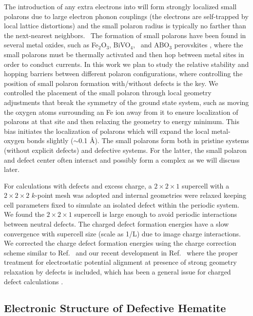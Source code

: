 The introduction of any extra electrons into  will form strongly localized small polarons due to large electron phonon couplings (the electrons are self-trapped by local lattice distortions) and the small polaron radius is typically no farther than the next-nearest neighbors.~\cite{austin1969polarons} The formation of small polarons have been found in several metal oxides, such as Fe$_2$O$_3$, BiVO$_4$,~\cite{kim2015simultaneous} and ABO$_{3}$ perovskites \cite{eglitis2014ab}, where the small polarons must be thermally activated and then hop between metal sites in order to conduct currents. In this work we plan to study the relative stability and hopping barriers between different polaron configurations, where controlling the position of small polaron formation with/without defects is the key. We controlled the placement of the small polaron through local geometry adjustments that break the symmetry of the ground state system, such as moving the oxygen atoms surrounding an Fe ion away from it to ensure localization of polarons at that site and then relaxing the geometry to energy minimum. This bias initiates the localization of polarons which will expand the local metal-oxygen bonds slightly ($\sim$0.1 \AA).  The small polarons form both in pristine systems (without explicit defects) and defective systems. For the latter, the small polaron and defect center often interact and possibly form a complex as we will discuss later.

For calculations with defects and excess charge, a $2\times 2\times 1$ supercell with a $2\times2\times2$ $k$-point mesh was adopted and internal geometries were relaxed keeping cell parameters fixed to simulate an isolated defect within the periodic system.  We found the $2\times 2\times 1$ supercell is large enough to avoid periodic interactions between neutral defects. The charged defect formation energies have a slow convergence with supercell size (scale as 1/L) due to image charge interactions. We corrected the charge defect formation energies using the charge correction scheme similar to Ref.~\cite{freysoldt2014first} and our recent development in Ref.~\cite{PING2017JCP} where the proper treatment for electrostatic potential alignment at presence of strong geometry relaxation by defects is included, which has been a general issue for charged defect calculations \cite{kumagai2014electrostatics}.



\subsection{Electronic Structure of Defective Hematite}


